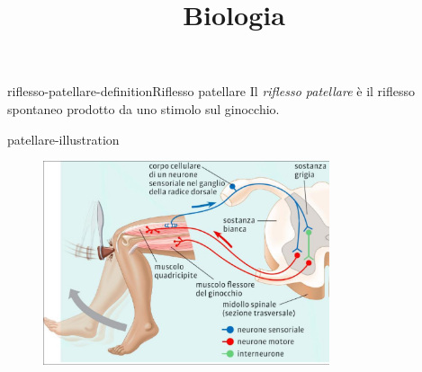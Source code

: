 \documentclass[preview]{standalone}
\begin{document}
\title{Biologia}
\genpage

\begin{snippetdefinition}{riflesso-patellare-definition}{Riflesso patellare}
    Il \textit{riflesso patellare} è il riflesso spontaneo prodotto
    da uno stimolo sul ginocchio.
\end{snippetdefinition}

\begin{snippet}{patellare-illustration}
    \begin{center}
    \begin{figure}[ht]
        \centering
        \includegraphics[width=0.75\textwidth]{./resources/patellare.png}
    \end{figure}
    \end{center}
\end{snippet}
\end{document}
